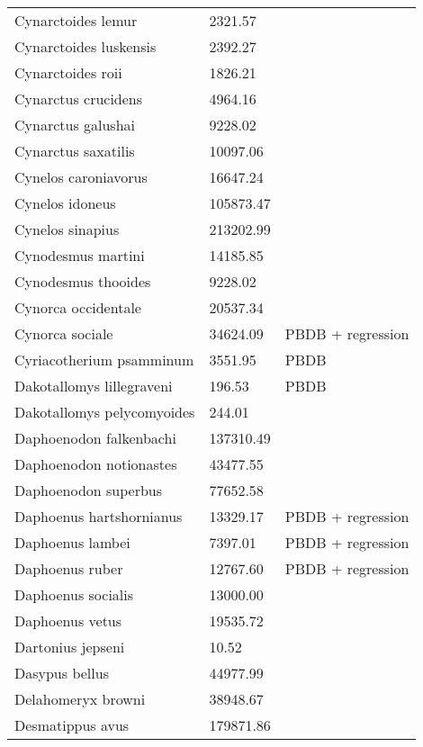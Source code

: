 \begin{center}
\begin{longtable}{p{} p{} p{} }
  Cynarctoides lemur & 2321.57 & \cite{Tomiya2013} \\ 
  Cynarctoides luskensis & 2392.27 & \cite{Tomiya2013} \\ 
  Cynarctoides roii & 1826.21 & \cite{Tomiya2013} \\ 
  Cynarctus crucidens & 4964.16 & \cite{Tomiya2013} \\ 
  Cynarctus galushai & 9228.02 & \cite{Tomiya2013} \\ 
  Cynarctus saxatilis & 10097.06 & \cite{Tomiya2013} \\ 
  Cynelos caroniavorus & 16647.24 & \cite{Tomiya2013} \\ 
  Cynelos idoneus & 105873.47 & \cite{Tomiya2013} \\ 
  Cynelos sinapius & 213202.99 & \cite{Tomiya2013} \\ 
  Cynodesmus martini & 14185.85 & \cite{Tomiya2013} \\ 
  Cynodesmus thooides & 9228.02 & \cite{Tomiya2013} \\ 
  Cynorca occidentale & 20537.34 & \cite{Tomiya2013} \\ 
  Cynorca sociale & 34624.09 & PBDB + regression \\ 
  Cyriacotherium psamminum & 3551.95 & PBDB \\ 
  Dakotallomys lillegraveni & 196.53 & PBDB \\ 
  Dakotallomys pelycomyoides & 244.01 & \cite{Mihlbachler2006} \\ 
  Daphoenodon falkenbachi & 137310.49 & \cite{Tomiya2013} \\ 
  Daphoenodon notionastes & 43477.55 & \cite{Tomiya2013} \\ 
  Daphoenodon superbus & 77652.58 & \cite{Tomiya2013} \\ 
  Daphoenus hartshornianus & 13329.17 & PBDB + regression \\ 
  Daphoenus lambei & 7397.01 & PBDB + regression \\ 
  Daphoenus ruber & 12767.60 & PBDB + regression \\ 
  Daphoenus socialis & 13000.00 & \cite{McKenna2011} \\ 
  Daphoenus vetus & 19535.72 & \cite{Tomiya2013} \\ 
  Dartonius jepseni & 10.52 & \cite{Hay1969} \\ 
  Dasypus bellus & 44977.99 & \cite{Smith2004} \\ 
  Delahomeryx browni & 38948.67 & \cite{Tomiya2013} \\ 
  Desmatippus avus & 179871.86 & \cite{Tomiya2013} \\ 

\end{longtable}
\end{center}
